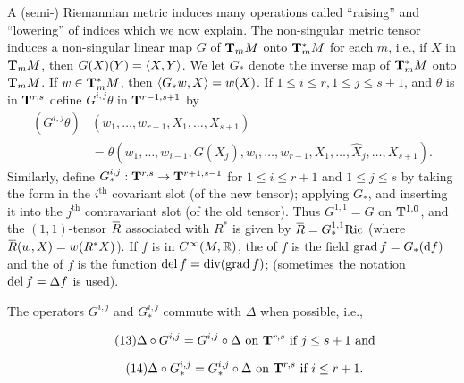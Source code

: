 \documentclass[../main]{subfiles}
\begin{document}
A (semi-) Riemannian metric induces many operations called ``raising'' and ``lowering'' of indices which we now explain. The non-singular metric tensor induces a non-singular linear map $G$ of $\tangentspace M m$ onto $\cotangentspace M m$ for each $m$, i.e., if $X$ in $\tangentspace M m$, then $G(X)(Y)= \ip X Y$. We let $G_\ast$ denote the inverse map of $\cotangentspace M m$ onto $\tangentspace M m$. If $w\in\cotangentspace M m$, then $\ip {G_\ast w} X = w(X)$. If $1 \leq i \leq r, 1 \leq j \leq s+1$, and $\theta$ is in $\tensorbundle{}{r}{ s}$ define $G^{i, j} \theta$ in $\tensorbundle{}{r-1}{ s+1}$ by
\begin{equation}\tag{12}
\label{eqn:ch07.12}
\begin{split}
(G^{i, j} \theta)&(w_1, \ldots, w_{r - 1}, X_1, \ldots, X_{s + 1}) \\ &= \theta(w_1, \ldots, w_{i - 1}, G(X_j), w_i, \ldots, w_{r - 1}, X_1, \ldots, \widehat{X}_j, \ldots, X_{s + 1}).
\end{split}
\end{equation}
Similarly, define $G_\ast^{i, j} : \tensorbundle{}{r}{ s} \functionMaps \tensorbundle{}{r + 1}{ s - 1}$ for $1 \le i \le r + 1$ and $1 \le j \le s$ by taking the form in the $i^{\mathrm{th}}$ covariant slot (of the new tensor); applying $G_\ast$, and inserting it into the $j^{\mathrm{th}}$ contravariant slot (of the old tensor). Thus $G^{1, 1} = G$ on $\tensorbundle{}{1}{ 0}$, and the $(1, 1)$-tensor $\xoverline R$ associated with $R^\ast$ is given by $\xoverline R = G_\ast^{1, 1} \Ric$ (where $\xoverline R(w, X) = w(R^\ast X)$). If $f$ is in $\CInfty(M, \bbR)$, the  of $f$ is the field $\grad f = G_\ast(\dd f)$ and the  of $f$ is the function $\del f = \Div(\grad f)$; (sometimes the notation $\del f = \Delta f$ is used). 

The operators $G^{i, j}$ and $G_\ast^{i, j}$ commute with $\Delta$ when possible, i.e.,

\begin{equation}\tag{13}
\label{eqn:ch07.13}
\Delta \circ G^{i, j} = G^{i, j} \circ \Delta \text { on } \tensorbundle{}{r}{ s} \text { if } j \le s + 1 \text { and}
\end{equation}

\begin{equation}\tag{14}
\label{eqn:ch07.14}
\Delta \circ G_\ast^{i, j} = G_\ast^{i, j} \circ \Delta \text { on } \tensorbundle{}{r}{ s} \text { if } i \le r + 1.
\end{equation}
\end{document}
